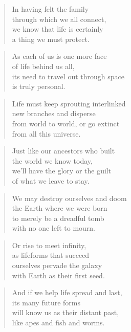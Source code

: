 \documentclass[10pt,a4paper]{article}
\begin{document}
\begin{multicols}{2}
\begin{verse}
In having felt the family\\
through which we all connect,\\
we know that life is certainly\\
a thing we must protect.
\end{verse}

\begin{verse}
As each of us is one more face\\
of life behind us all,\\
its need to travel out through space\\
is truly personal.
\end{verse}

\begin{verse}
Life must keep sprouting interlinked\\
new branches and disperse\\
from world to world, or go extinct\\
from all this universe.
\end{verse}

\begin{verse}
Just like our ancestors who built\\
the world we know today,\\
we’ll have the glory or the guilt\\
of what we leave to stay.
\end{verse}

\begin{verse}
We may destroy ourselves and doom\\
the Earth where we were born\\
to merely be a dreadful tomb\\
with no one left to mourn.
\end{verse}

\begin{verse}
Or rise to meet infinity,\\
as lifeforms that succeed\\
ourselves pervade the galaxy\\
with Earth as their first seed.
\end{verse}

\begin{verse}
And if we help life spread and last,\\
its many future forms\\
will know us as their distant past,\\
like apes and fish and worms.
\end{verse}


\end{multicols}
\end{document}
